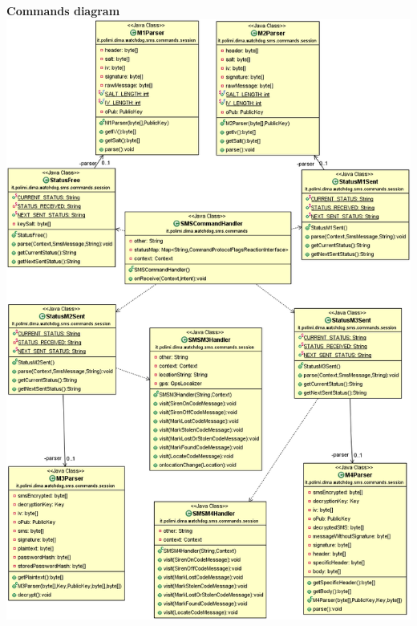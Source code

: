 \begin{center}
\textbf{Commands diagram}\\
\includegraphics[scale=0.45]{images/commands}
\end{center}
\newpage
